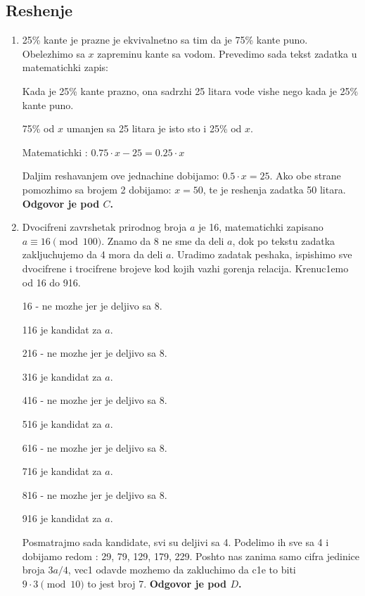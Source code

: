 \documentclass[a4paper,12pt]{article}
\begin{document}
\newpage

\subsection{Reshenje}
\begin{enumerate}[1.]

\item 25\% kante je prazne je ekvivalnetno sa tim da je 75\% kante puno. Obelezhimo sa $x$ zapreminu kante sa vodom. Prevedimo sada tekst zadatka u matematichki zapis:
\par Kada je 25\% kante prazno, ona sadrzhi 25 litara vode vishe nego kada je 25\% kante puno.
\par 75\% od $x$ umanjen sa 25 litara je isto sto i 25\% od $x$.
\par Matematichki : $ 0.75 \cdot x - 25 = 0.25 \cdot x$
\par Daljim reshavanjem ove jednachine dobijamo: $ 0.5 \cdot x = 25$. Ako obe strane pomozhimo sa brojem 2 dobijamo: $x = 50$, te je reshenja zadatka 50 litara. \textbf{Odgovor je pod $C$.}

\item Dvocifreni zavrshetak prirodnog broja $a$ je 16, matematichki zapisano $ a \equiv 16 \pmod{100}$. Znamo da 8 ne sme da deli $a$, dok po tekstu zadatka zakljuchujemo da 4 mora da deli $a$. Uradimo zadatak peshaka, ispishimo sve dvocifrene i trocifrene brojeve kod kojih vazhi gorenja relacija. Krenuc1emo od 16 do 916.
\par 16 - ne mozhe jer je deljivo sa 8.
\par 116 je kandidat za $a$.
\par 216 - ne mozhe jer je deljivo sa 8.
\par 316 je kandidat za $a$.
\par 416 - ne mozhe jer je deljivo sa 8.
\par 516 je kandidat za $a$.
\par 616 - ne mozhe jer je deljivo sa 8.
\par 716 je kandidat za $a$.
\par 816 - ne mozhe jer je deljivo sa 8.
\par 916 je kandidat za $a$.
\par Posmatrajmo sada kandidate, svi su deljivi sa 4. Podelimo ih sve sa 4 i dobijamo redom : 29, 79, 129, 179, 229. Poshto nas zanima samo cifra jedinice broja $3a/4$, vec1 odavde mozhemo da zakluchimo da c1e to biti $9 \cdot 3 \pmod{10}$ to jest broj 7. \textbf{Odgovor je pod $D$.}


\end{enumerate}
\end{document}
